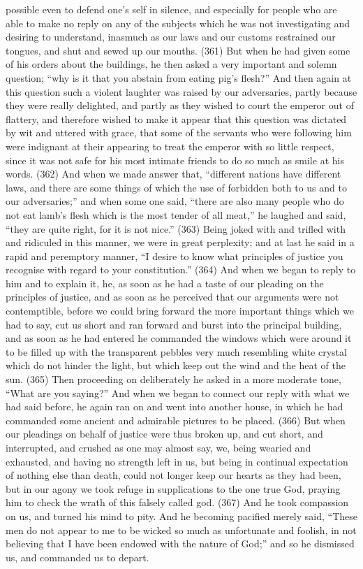 possible even to defend one's self in silence, and especially for people who are able to make no
reply on any of the subjects which he was not investigating and desiring to understand, inasmuch
as our laws and our customs restrained our tongues, and shut and sewed up our mouths. (361)
But when he had given some of his orders about the buildings, he then asked a very important and
solemn question; ``why is it that you abstain from eating pig's flesh?'' And then again at this question
such a violent laughter was raised by our adversaries, partly because they were really delighted,
and partly as they wished to court the emperor out of flattery, and therefore wished to make it
appear that this question was dictated by wit and uttered with grace, that some of the servants who
were following him were indignant at their appearing to treat the emperor with so little respect, since
it was not safe for his most intimate friends to do so much as smile at his words. (362) And when
we made answer that, ``different nations have different laws, and there are some things of which
the use of forbidden both to us and to our adversaries;'' and when some one said, ``there are also
many people who do not eat lamb's flesh which is the most tender of all meat,'' he laughed and
said, ``they are quite right, for it is not nice.'' (363) Being joked with and trifled with and ridiculed in
this manner, we were in great perplexity; and at last he said in a rapid and peremptory manner, ``I
desire to know what principles of justice you recognise with regard to your constitution.'' (364) And
when we began to reply to him and to explain it, he, as soon as he had a taste of our pleading on
the principles of justice, and as soon as he perceived that our arguments were not contemptible,
before we could bring forward the more important things which we had to say, cut us short and ran
forward and burst into the principal building, and as soon as he had entered he commanded the
windows which were around it to be filled up with the transparent pebbles very much resembling
white crystal which do not hinder the light, but which keep out the wind and the heat of the sun.
(365) Then proceeding on deliberately he asked in a more moderate tone, ``What are you saying?''
And when we began to connect our reply with what we had said before, he again ran on and went
into another house, in which he had commanded some ancient and admirable pictures to be
placed. (366) But when our pleadings on behalf of justice were thus broken up, and cut short, and
interrupted, and crushed as one may almost say, we, being wearied and exhausted, and having no
strength left in us, but being in continual expectation of nothing else than death, could not longer
keep our hearts as they had been, but in our agony we took refuge in supplications to the one true
God, praying him to check the wrath of this falsely called god. (367) And he took compassion on
us, and turned his mind to pity. And he becoming pacified merely said, ``These men do not appear
to me to be wicked so much as unfortunate and foolish, in not believing that I have been endowed
with the nature of God;'' and so he dismissed us, and commanded us to depart.

